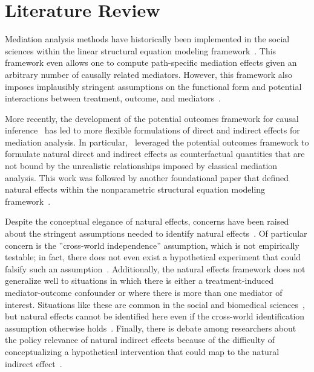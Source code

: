\chapter{Literature Review}\label{chapter:lit_review}

Mediation analysis methods have historically been implemented in the social sciences 
within the linear structural equation modeling framework~\citep{wright1934,baronkenny1986}.
This framework even allows one to compute path-specific mediation effects given an 
arbitrary number of causally related mediators. However, this framework also 
imposes implausibly stringent assumptions on the functional form 
and potential interactions between treatment, outcome, and mediators~\citep{pearl2001}. 

More recently, the development of the potential outcomes framework for causal 
inference~\citep{rubin1974} has led to more flexible formulations of direct and indirect 
effects for mediation analysis. In particular,~\cite{robinsgreenland1992} leveraged 
the potential outcomes framework to formulate natural direct and indirect effects as 
counterfactual quantities that are not bound by the unrealistic relationships imposed by 
classical mediation analysis. This work was followed by another foundational paper that 
defined natural effects within the nonparametric structural equation modeling
framework~\citep{pearl2001}.

Despite the conceptual elegance of natural effects, concerns have been raised about the 
stringent assumptions needed to identify natural 
effects~\citep{vanderweelevansteelandt2009,imaietal2010b,vanderweele2015}. 
Of particular concern is the ”cross-world independence” assumption, 
which is not empirically testable; in fact, there does not even
exist a hypothetical experiment that could falsify such an assumption~\citep{robinsrichardson2010}. 
Additionally, the natural effects framework does not generalize well to situations in which
there is either a treatment-induced mediator-outcome confounder or where there is more than one
mediator of interest. Situations like these are common in the 
social and biomedical sciences~\citep{vansteelandtdaniel2017}, 
but natural effects cannot be identified here even if the cross-world identification assumption 
otherwise holds~\citep{avinetal2005,vanderweeleetal2014}. Finally, there is debate among 
researchers about the policy relevance of natural indirect effects because of the 
difficulty of conceptualizing a hypothetical intervention that could map to the natural 
indirect effect~\citep{vanderweelevansteelandt2009}.

